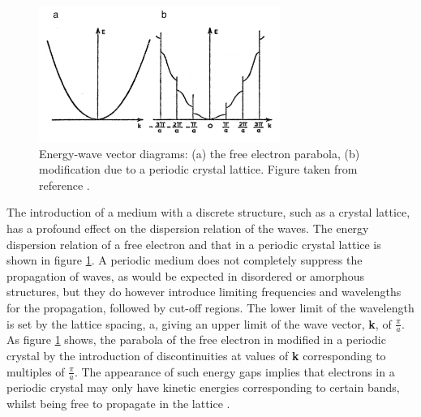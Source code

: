 \begin{figure}[h!]
  \centering
    \includegraphics[width=0.7\textwidth]{figures/bs1.png}
    \caption{Energy-wave vector diagrams: (a) the free electron parabola, (b) modification due to a periodic crystal lattice. Figure taken from reference .}
  \label{bs1}
\end{figure}

The introduction of a medium with a discrete structure, such as a crystal lattice, has a profound effect on the dispersion relation of the waves. The energy dispersion relation of a free electron and that in a periodic crystal lattice is shown in figure \ref{bs1}. A periodic medium does not completely suppress the propagation of waves, as would be expected  in disordered or amorphous structures, but they do however introduce limiting frequencies and wavelengths for the propagation, followed by cut-off regions. The lower limit of the wavelength is set by the lattice spacing, a, giving an upper limit of the wave vector, \textbf{k}, of $\frac{\pi}{a}$. As figure \ref{bs1} shows, the parabola of the free electron in modified in a periodic crystal by the introduction of discontinuities at values of \textbf{k} corresponding to multiples of $\frac{\pi}{a}$. The appearance of such energy gaps implies that electrons in a periodic crystal may only have kinetic energies corresponding to certain bands, whilst being free to propagate in the lattice \cite{small_semiconductor2}.

